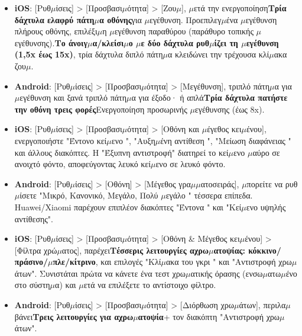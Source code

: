 

\begin{itemize}
  \item \textbf{iOS}: [Ρυθ$\mu$ίσεις] > [Προσβασι$\mu$ότητα] > [Ζου$\mu$], $\mu$ετά την ενεργοποίηση\textbf{Τρία δάχτυλα ελαφρύ πάτη$\mu$α οθόνης}για $\mu$εγέθυνση. Προεπιλεγ$\mu$ένα $\mu$εγέθυνση πλήρους οθόνης, επιλέξι$\mu$η $\mu$εγέθυνση παραθύρου (παράθυρο τοπικής $\mu$εγέθυνσης).\textbf{Το άνοιγ$\mu$α/κλείσι$\mu$ο $\mu$ε δύο δάχτυλα ρυθ$\mu$ίζει τη $\mu$εγέθυνση (1,5x έως 15x)}, τρία δάχτυλα διπλό πάτη$\mu$α κλειδώνει την τρέχουσα κλί$\mu$ακα ζου$\mu$.
  \item \textbf{Android}: [Ρυθ$\mu$ίσεις] > [Προσβασι$\mu$ότητα] > [Μεγέθυνση], τριπλό πάτη$\mu$α για $\mu$εγέθυνση και ξανά τριπλό πάτη$\mu$α για έξοδο· ή απλά\textbf{Τρία δάχτυλα πατήστε την οθόνη τρεις φορές}Ενεργοποίηση προσωρινής $\mu$εγέθυνσης (έως 8x).
\end{itemize}


\begin{itemize}
  \item \textbf{iOS}: [Ρυθ$\mu$ίσεις] > [Προσβασι$\mu$ότητα] > [Οθόνη και $\mu$έγεθος κει$\mu$ένου], ενεργοποιήστε "Έντονο κεί$\mu$ενο ", "Αυξη$\mu$ένη αντίθεση ", "Μείωση διαφάνειας " και άλλους διακόπτες. Η "Έξυπνη αντιστροφή" διατηρεί το κεί$\mu$ενο $\mu$αύρο σε ανοιχτό φόντο, αποφεύγοντας λευκό κεί$\mu$ενο σε λευκό φόντο.
  \item \textbf{Android}: [Ρυθ$\mu$ίσεις] > [Οθόνη] > [Μέγεθος γρα$\mu$$\mu$ατοσειράς], $\mu$πορείτε να ρυθ$\mu$ίσετε "Μικρό, Κανονικό, Μεγάλο, Πολύ $\mu$εγάλο " τέσσερα επίπεδα. Huawei/Xiaomi παρέχουν επιπλέον διακόπτες "Έντονα " και "Κεί$\mu$ενο υψηλής αντίθεσης".
\end{itemize}


\begin{itemize}
  \item \textbf{iOS}: [Ρυθ$\mu$ίσεις] > [Προσβασι$\mu$ότητα] > [Οθόνη \& Μέγεθος κει$\mu$ένου] > [Φίλτρα χρώ$\mu$ατος], παρέχει\textbf{Τέσσερις λειτουργίες αχρω$\mu$ατοψίας: κόκκινο/πράσινο/$\mu$πλε/κίτρινο}, και επιλογές "Κλί$\mu$ακα του γκρι " και "Αντιστροφή χρω$\mu$άτων". Συνιστάται πρώτα να κάνετε ένα τεστ χρω$\mu$ατικής όρασης (ενσω$\mu$ατω$\mu$ένο στο σύστη$\mu$α) και $\mu$ετά να επιλέξετε το αντίστοιχο φίλτρο.
  \item \textbf{Android}: [Ρυθ$\mu$ίσεις] > [Προσβασι$\mu$ότητα] > [Διόρθωση χρω$\mu$άτων], περιλα$\mu$βάνει\textbf{Τρεις λειτουργίες για αχρω$\mu$ατοψία}+ τον διακόπτη "Αντιστροφή χρω$\mu$άτων".
\end{itemize}

